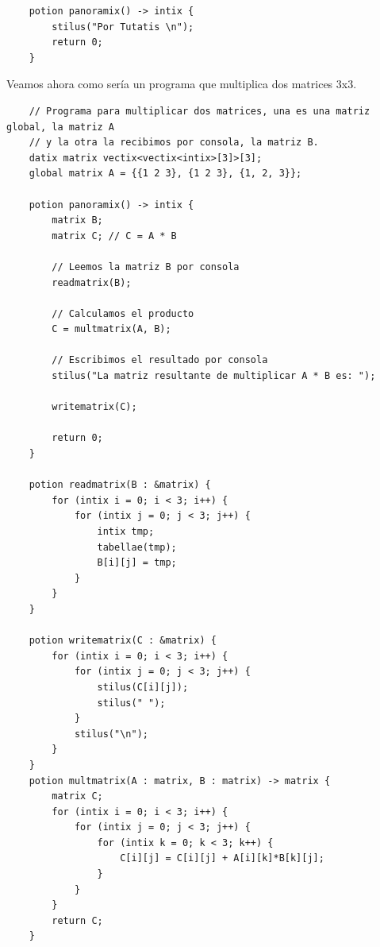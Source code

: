 \documentclass[a4paper, 10pt]{article}
\begin{document}
    \begin{verbatim}
    potion panoramix() -> intix {
        stilus("Por Tutatis \n");
        return 0;
    }
    \end{verbatim}
    
    Veamos ahora como sería un programa que multiplica dos matrices 3x3.
    \begin{verbatim}
    // Programa para multiplicar dos matrices, una es una matriz global, la matriz A 
    // y la otra la recibimos por consola, la matriz B.
    datix matrix vectix<vectix<intix>[3]>[3];
    global matrix A = {{1 2 3}, {1 2 3}, {1, 2, 3}};
    
    potion panoramix() -> intix {
        matrix B;
        matrix C; // C = A * B
        
        // Leemos la matriz B por consola
        readmatrix(B);
        
        // Calculamos el producto
        C = multmatrix(A, B);
    
        // Escribimos el resultado por consola
        stilus("La matriz resultante de multiplicar A * B es: ");

        writematrix(C);
        
        return 0;
    }
    
    potion readmatrix(B : &matrix) {
        for (intix i = 0; i < 3; i++) {
            for (intix j = 0; j < 3; j++) {
                intix tmp;
                tabellae(tmp);
                B[i][j] = tmp;
            }
        }
    }
    
    potion writematrix(C : &matrix) {
        for (intix i = 0; i < 3; i++) {
            for (intix j = 0; j < 3; j++) {
                stilus(C[i][j]);
                stilus(" ");
            }
            stilus("\n");
        }
    }
    potion multmatrix(A : matrix, B : matrix) -> matrix {
        matrix C;
        for (intix i = 0; i < 3; i++) {
            for (intix j = 0; j < 3; j++) {
                for (intix k = 0; k < 3; k++) {
                    C[i][j] = C[i][j] + A[i][k]*B[k][j];
                }
            }
        }
        return C;
    }
    \end{verbatim}
\end{document}
